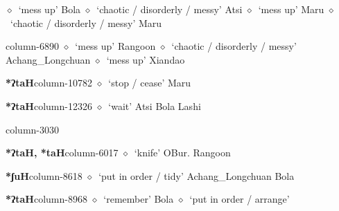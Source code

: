         $\diamond$~`mess up'
         Bola 
\hspace{1ex}
         $\diamond$~`chaotic / disorderly / messy'
         Atsi 
\hspace{1ex}
         $\diamond$~`mess up'
         Maru 
\hspace{1ex}
         $\diamond$~`chaotic / disorderly / messy'
         Maru 
  \item {\footnotesize \textbf{}}{\tiny column-6890}
         $\diamond$~`mess up'
         Rangoon 
\hspace{1ex}
         $\diamond$~`chaotic / disorderly / messy'
         Achang\_Longchuan 
\hspace{1ex}
         $\diamond$~`mess up'
         Xiandao 
  \item {\footnotesize \textbf{*ʔtaH}}{\tiny column-10782}
         $\diamond$~`stop / cease'
         Maru 
  \item {\footnotesize \textbf{*ʔtaH}}{\tiny column-12326}
         $\diamond$~`wait'
         Atsi 
\hspace{1ex}
         Bola 
\hspace{1ex}
         Lashi 
  \item {\footnotesize \textbf{}}{\tiny column-3030}
  \item {\footnotesize \textbf{*ʔtaH, *taH}}{\tiny column-6017}
         $\diamond$~`knife'
         OBur. 
\hspace{1ex}
         Rangoon 
  \item {\footnotesize \textbf{*ʃuH}}{\tiny column-8618}
         $\diamond$~`put in order / tidy'
         Achang\_Longchuan 
\hspace{1ex}
         Bola 
  \item {\footnotesize \textbf{*ʔtaH}}{\tiny column-8968}
         $\diamond$~`remember'
         Bola 
\hspace{1ex}
         $\diamond$~`put in order / arrange'
